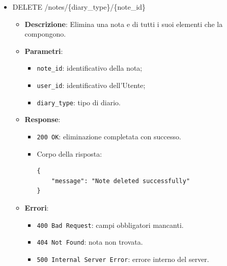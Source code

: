 \documentclass[a4paper,12pt]{article}
\newcommand{\code}[1]{{\ttfamily\textcolor{purple!85!black}{#1}}}
\begin{document}
\begin{itemize}
\begin{itemize}
            \item \textbf{Errori}:
            \begin{itemize}
                \item \texttt{400 Bad Request}: diary\_type non valido.
                \item \texttt{404 Not Found}: nota non trovata.
                \item \texttt{500 Internal Server Error}: errore interno del server.
            \end{itemize}
        \end{itemize}

    \item \code{DELETE /notes/\{diary\_type\}/\{note\_id\}}
        \begin{itemize}
            \item \textbf{Descrizione}: Elimina una nota e di tutti i suoi elementi che la compongono.

            \item \textbf{Parametri}:
            \begin{itemize}
                \item \texttt{note\_id}: identificativo della nota;
                \item \texttt{user\_id}: identificativo dell'Utente;
                \item \texttt{diary\_type}: tipo di diario.
            \end{itemize}

            \item \textbf{Response}:
            \begin{itemize}
                \item \texttt{200 OK}: eliminazione completata con successo.
                \item Corpo della risposta:
\begin{verbatim}
{
    "message": "Note deleted successfully"
}
\end{verbatim}
            \end{itemize}

            \item \textbf{Errori}:
            \begin{itemize}
                \item \texttt{400 Bad Request}: campi obbligatori mancanti.
                \item \texttt{404 Not Found}: nota non trovata.
                \item \texttt{500 Internal Server Error}: errore interno del server.
            \end{itemize}
        \end{itemize}


\end{itemize}
\end{document}
